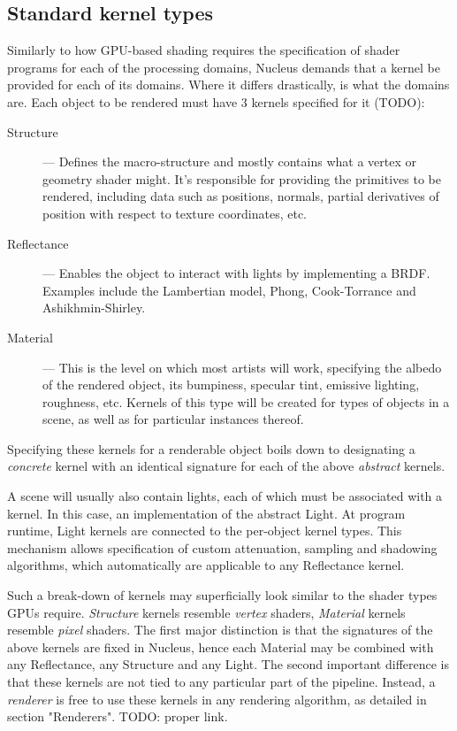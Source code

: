 \subsection{Standard kernel types}

Similarly to how GPU-based shading requires the specification of shader programs for each of the processing domains, Nucleus demands that a kernel be provided for each of its domains. Where it differs drastically, is what the domains are. Each object to be rendered must have 3 kernels specified for it (TODO):

\begin{description}

\item[Structure] --- Defines the macro-structure and mostly contains what a vertex or geometry shader might. It's responsible for providing the primitives to be rendered, including data such as positions, normals, partial derivatives of position with respect to texture coordinates, etc.

\item[Reflectance] --- Enables the object to interact with lights by implementing a BRDF. Examples include the Lambertian model, Phong, Cook-Torrance and Ashikhmin-Shirley.

\item[Material] --- This is the level on which most artists will work, specifying the albedo of the rendered object, its bumpiness, specular tint, emissive lighting, roughness, etc. Kernels of this type will be created for types of objects in a scene, as well as for particular instances thereof.

\end{description}

Specifying these kernels for a renderable object boils down to designating a \emph{concrete} kernel with an identical signature for each of the above \emph{abstract} kernels.

A scene will usually also contain lights, each of which must be associated with a kernel. In this case, an implementation of the abstract Light. At program runtime, Light kernels are connected to the per-object kernel types. This mechanism allows specification of custom attenuation, sampling and shadowing algorithms, which automatically are applicable to any Reflectance kernel.


Such a break-down of kernels may superficially look similar to the shader types GPUs require. \emph{Structure} kernels resemble \emph{vertex} shaders, \emph{Material} kernels resemble \emph{pixel} shaders. The first major distinction is that the signatures of the above kernels are fixed in Nucleus, hence each Material may be combined with any Reflectance, any Structure and any Light. The second important difference is that these kernels are not tied to any particular part of the pipeline. Instead, a \emph{renderer} is free to use these kernels in any rendering algorithm, as detailed in section "Renderers". TODO: proper link.

